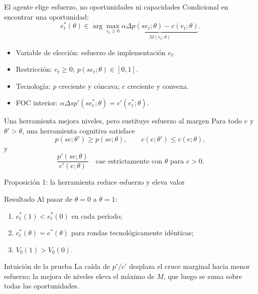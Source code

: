 \documentclass[aspectratio=169,11pt]{beamer}
\begin{document}
\begin{frame}{El agente elige esfuerzo, no oportunidades ni capacidades}
  Condicional en encontrar una oportunidad:
  \[
  e_t^*(\theta)\in\arg\max_{e_t\ge0}
  \underbrace{\alpha\Delta p(se_t;\theta)-c(e_t;\theta)}_{M(e_t;\theta)}.
  \]
  \begin{itemize}
    \item Variable de elección: esfuerzo de implementación $e_t$.
    \item Restricción: $e_t\ge0$; $p(se_t;\theta)\in[0,1]$.
    \item Tecnología: $p$ creciente y cóncava; $c$ creciente y convexa.
    \item FOC interior: $\alpha\Delta s p'(se_t^*;\theta)=c'(e_t^*;\theta)$.
  \end{itemize}
\end{frame}

\begin{frame}{Una herramienta mejora niveles, pero sustituye esfuerzo al margen}
  Para todo $e$ y $\theta'>\theta$, una herramienta cognitiva satisface
  \[
    p(se;\theta')\ge p(se;\theta),\qquad
    c(e;\theta')\le c(e;\theta),
  \]
  y
  \[
    \frac{p'(se;\theta)}{c'(e;\theta)}
    \quad\text{cae estrictamente con }\theta\text{ para }e>0.
  \]
\end{frame}

\begin{frame}{Proposición 1: la herramienta reduce esfuerzo y eleva valor}
  \begin{block}{Resultado}
  Al pasar de $\theta=0$ a $\theta=1$:
  \begin{enumerate}
    \item $e_t^*(1)<e_t^*(0)$ en cada período;
    \item $e_t^*(\theta)=e^*(\theta)$ para rondas tecnológicamente idénticas;
    \item $V_0(1)>V_0(0)$.
  \end{enumerate}
  \end{block}
  \medskip
  \begin{block}{Intuición de la prueba}
    La caída de $p'/c'$ desplaza el cruce marginal hacia menor esfuerzo; la
    mejora de niveles eleva el máximo de $M$, que luego se suma sobre todas las
    oportunidades.
  \end{block}
\end{frame}
\end{document}
